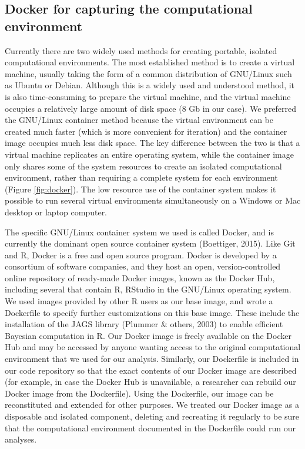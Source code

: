 \documentclass[american,man]{apa6}
\begin{document}
\subsection{Docker for capturing the computational
environment}\label{docker-for-capturing-the-computational-environment}

Currently there are two widely used methods for creating portable,
isolated computational environments. The most established method is to
create a virtual machine, usually taking the form of a common
distribution of GNU/Linux such as Ubuntu or Debian. Although this is a
widely used and understood method, it is also time-consuming to prepare
the virtual machine, and the virtual machine occupies a relatively large
amount of disk space (8 Gb in our case). We preferred the GNU/Linux
container method because the virtual environment can be created much
faster (which is more convenient for iteration) and the container image
occupies much less disk space. The key difference between the two is
that a virtual machine replicates an entire operating system, while the
container image only shares some of the system resources to create an
isolated computational environment, rather than requiring a complete
system for each environment (Figure \ref{fig:docker}). The low resource
use of the container system makes it possible to run several virtual
environments simultaneously on a Windows or Mac desktop or laptop
computer.

The specific GNU/Linux container system we used is called Docker, and is
currently the dominant open source container system (Boettiger, 2015).
Like Git and R, Docker is a free and open source program. Docker is
developed by a consortium of software companies, and they host an open,
version-controlled online repository of ready-made Docker images, known
as the Docker Hub, including several that contain R, RStudio in the
GNU/Linux operating system. We used images provided by other R users as
our base image, and wrote a Dockerfile to specify further customizations
on this base image. These include the installation of the JAGS library
(Plummer \& others, 2003) to enable efficient Bayesian computation in R.
Our Docker image is freely available on the Docker Hub and may be
accessed by anyone wanting access to the original computational
environment that we used for our analysis. Similarly, our Dockerfile is
included in our code repository so that the exact contents of our Docker
image are described (for example, in case the Docker Hub is unavailable,
a researcher can rebuild our Docker image from the Dockerfile). Using
the Dockerfile, our image can be reconstituted and extended for other
purposes. We treated our Docker image as a disposable and isolated
component, deleting and recreating it regularly to be sure that the
computational environment documented in the Dockerfile could run our
analyses.
\end{document}
